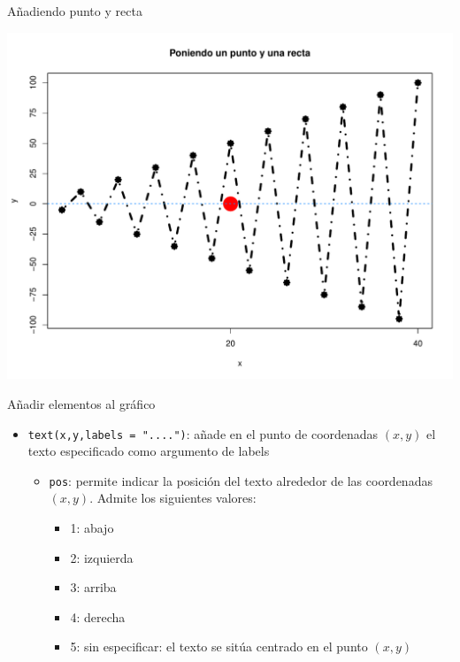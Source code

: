 \documentclass[
  ignorenonframetext,
]{beamer}
\providecommand{\tightlist}{%
  \setlength{\itemsep}{0pt}\setlength{\parskip}{0pt}}
\begin{document}
\begin{frame}{Añadiendo punto y recta}
\label{auxf1adiendo-punto-y-recta-1}
\begin{center}\includegraphics[width=0.8\linewidth]{R_base_files/figure-beamer/unnamed-chunk-40-1} \end{center}
\end{frame}

\begin{frame}[fragile]{Añadir elementos al gráfico}
\label{auxf1adir-elementos-al-gruxe1fico-1}
\begin{itemize}
\tightlist
\item
  \texttt{text(x,y,labels\ =\ "....")}: añade en el punto de coordenadas
  \((x,y)\) el texto especificado como argumento de labels

  \begin{itemize}
  \tightlist
  \item
    \texttt{pos}: permite indicar la posición del texto alrededor de las
    coordenadas \((x,y)\). Admite los siguientes valores:

    \begin{itemize}
    \tightlist
    \item
      1: abajo
    \item
      2: izquierda
    \item
      3: arriba
    \item
      4: derecha
    \item
      5: sin especificar: el texto se sitúa centrado en el punto
      \((x,y)\)
    \end{itemize}
  \end{itemize}
\end{itemize}
\end{frame}
\end{document}
